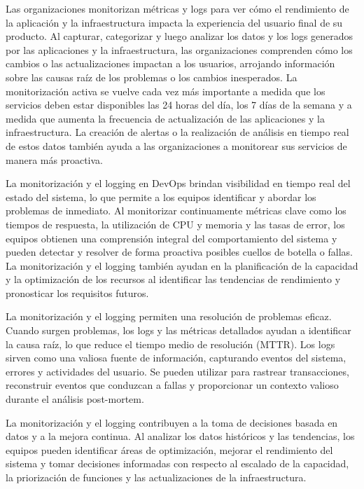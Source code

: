 \documentclass[12pt]{book}
\begin{document}
Las organizaciones monitorizan métricas y logs para ver cómo el rendimiento de la aplicación y la infraestructura impacta la experiencia del usuario final de su producto.
Al capturar, categorizar y luego analizar los datos y los logs generados por las aplicaciones y la infraestructura, las organizaciones comprenden cómo los cambios o las actualizaciones impactan a los usuarios, arrojando información sobre las causas raíz de los problemas o los cambios inesperados.
La monitorización activa se vuelve cada vez más importante a medida que los servicios deben estar disponibles las 24 horas del día, los 7 días de la semana y a medida que aumenta la frecuencia de actualización de las aplicaciones y la infraestructura. La creación de alertas o la realización de análisis en tiempo real de estos datos también ayuda a las organizaciones a monitorear sus servicios de manera más proactiva.

La monitorización y el logging en DevOps brindan visibilidad en tiempo real del estado del sistema, lo que permite a los equipos identificar y abordar los problemas de inmediato.
Al monitorizar continuamente métricas clave como los tiempos de respuesta, la utilización de CPU y memoria y las tasas de error, los equipos obtienen una comprensión integral del comportamiento del sistema y pueden detectar y resolver de forma proactiva posibles cuellos de botella o fallas.
La monitorización y el logging también ayudan en la planificación de la capacidad y la optimización de los recursos al identificar las tendencias de rendimiento y pronosticar los requisitos futuros.

La monitorización y el logging permiten una resolución de problemas eficaz. Cuando surgen problemas, los logs y las métricas detallados ayudan a identificar la causa raíz, lo que reduce el tiempo medio de resolución (MTTR).
Los logs sirven como una valiosa fuente de información, capturando eventos del sistema, errores y actividades del usuario. Se pueden utilizar para rastrear transacciones, reconstruir eventos que conduzcan a fallas y proporcionar un contexto valioso durante el análisis post-mortem.

La monitorización y el logging contribuyen a la toma de decisiones basada en datos y a la mejora continua.
Al analizar los datos históricos y las tendencias, los equipos pueden identificar áreas de optimización, mejorar el rendimiento del sistema y tomar decisiones informadas con respecto al escalado de la capacidad, la priorización de funciones y las actualizaciones de la infraestructura.
\end{document}
